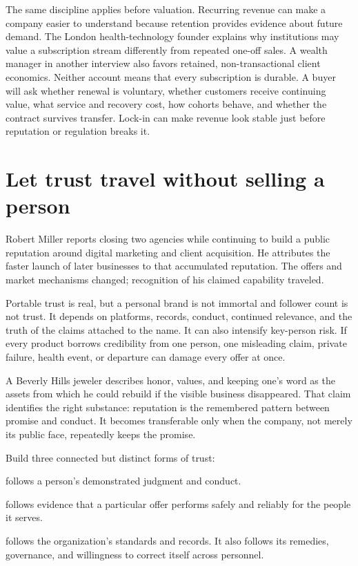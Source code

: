 The same discipline applies before valuation. Recurring revenue can make a
company easier to understand because retention provides evidence about future
demand. The London health-technology founder explains why institutions may
value a subscription stream differently from repeated one-off sales. A wealth
manager in another interview also favors retained, non-transactional client
economics. Neither account means that every subscription is durable. A buyer
will ask whether renewal is voluntary, whether customers receive continuing
value, what service and recovery cost, how cohorts behave, and whether the
contract survives transfer. Lock-in can make revenue look stable just before
reputation or regulation breaks it.

\section{Let trust travel without selling a person}

Robert Miller reports closing two agencies while continuing to build a public
reputation around digital marketing and client acquisition. He attributes the
faster launch of later businesses to that accumulated reputation. The offers
and market mechanisms changed; recognition of his claimed capability traveled.

Portable trust is real, but a personal brand is not immortal and follower count
is not trust. It depends on platforms, records, conduct, continued relevance,
and the truth of the claims attached to the name. It can also intensify
key-person risk. If every product borrows credibility from one person, one
misleading claim, private failure, health event, or departure can damage every
offer at once.

A Beverly Hills jeweler describes honor, values, and keeping one's word as the
assets from which he could rebuild if the visible business disappeared. That
claim identifies the right substance: reputation is the remembered pattern
between promise and conduct. It becomes transferable only when the company,
not merely its public face, repeatedly keeps the promise.

Build three connected but distinct forms of trust:

\enlargethispage{2\baselineskip}

\begin{description}[leftmargin=0em,style=unboxed,itemsep=0.08em,
  topsep=0.2em,parsep=0em,labelsep=0.55em]
\item[Personal trust] follows a person's demonstrated judgment and conduct.
\item[Product trust] follows evidence that a particular offer performs safely
  and reliably for the people it serves.
\item[Institutional trust] follows the organization's standards and records.
  It also follows its remedies, governance, and willingness to correct itself
  across personnel.
\end{description}

